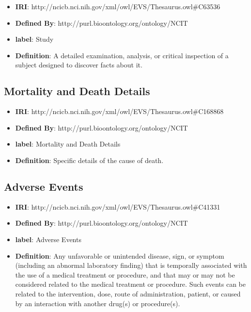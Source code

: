 \documentclass[a4paper,12pt,oneside]{article}
\begin{document}
\begin{itemize}
	\item \textbf{IRI}: http://ncicb.nci.nih.gov/xml/owl/EVS/Thesaurus.owl\#C63536
	\item \textbf{Defined By}: http://purl.bioontology.org/ontology/NCIT
	\item \textbf{label}: Study
	\item \textbf{Definition}: A detailed examination, analysis, or critical inspection of a subject designed to discover facts about it.
\end{itemize} 

  \subsection{Mortality and Death Details}

\begin{itemize}
	\item \textbf{IRI}: http://ncicb.nci.nih.gov/xml/owl/EVS/Thesaurus.owl\#C168868
	\item \textbf{Defined By}: http://purl.bioontology.org/ontology/NCIT
	\item \textbf{label}: Mortality and Death Details
	\item \textbf{Definition}: Specific details of the cause of death.
\end{itemize} 

  \subsection{Adverse Events}

\begin{itemize}
	\item \textbf{IRI}: http://ncicb.nci.nih.gov/xml/owl/EVS/Thesaurus.owl\#C41331
	\item \textbf{Defined By}: http://purl.bioontology.org/ontology/NCIT
	\item \textbf{label}: Adverse Events
	\item \textbf{Definition}: Any unfavorable or unintended disease, sign, or symptom (including an abnormal laboratory finding) that is temporally associated with the use of a medical treatment or procedure, and that may or may not be considered related to the medical treatment or procedure. Such events can be related to the intervention, dose, route of administration, patient, or caused by an interaction with another drug(s) or procedure(s).
\end{itemize} 
\end{document}
